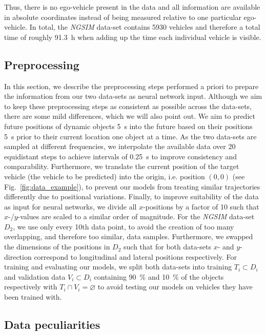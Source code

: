 Thus, there is no ego-vehicle present in the data and all information are available in absolute coordinates instead of being measured relative to one particular ego-vehicle.
In total, the \emph{\ac{NGSIM}} data-set contains \num{5930} vehicles and therefore a total time of roughly \SI{91.3}{\hour} when adding up the time each individual vehicle is visible.

\subsection{Preprocessing}
\label{subsec:preproc}

In this section, we describe the preprocessing steps performed a priori to prepare the information from our two data-sets as neural network input.
Although we aim to keep these preprocessing steps as consistent as possible across the data-sets, there are some mild differences, which we will also point out.
We aim to predict future positions of dynamic objects \SI{5}{\second} into the future based on their positions \SI{5}{\second} prior to their current location one object at a time.
As the two data-sets are sampled at different frequencies, we interpolate the available data over 20 equidistant steps to achieve intervals of \SI{0.25}{\second} to improve consistency and comparability.
Furthermore, we translate the current position of the target vehicle (the vehicle to be predicted) into the origin, i.e. position $\left(0,0\right)$ (see Fig.~\ref{fig:data_example}), to prevent our models from treating similar trajectories differently due to positional variations.
Finally, to improve suitability of the data as input for neural networks, we divide all $x$-positions by a factor of \num{10} such that $x$-/$y$-values are scaled to a similar order of magnitude.
For the \emph{\acs{NGSIM}} data-set $D_2$, we use only every \num{10}th data point, to avoid the creation of too many overlapping, and therefore too similar, data samples.
Furthermore, we swapped the dimensions of the positions in $D_2$ such that for both data-sets $x$- and $y$-direction correspond to longitudinal and lateral positions respectively.
For training and evaluating our models, we split both data-sets into training $T_i \subset D_i$ and validation data $V_i \subset D_i$ containing \SI{90}{\percent} and \SI{10}{\percent} of the objects respectively with $T_i \cap V_i = \varnothing$ to avoid testing our models on vehicles they have been trained with.

\subsection{Data peculiarities}

